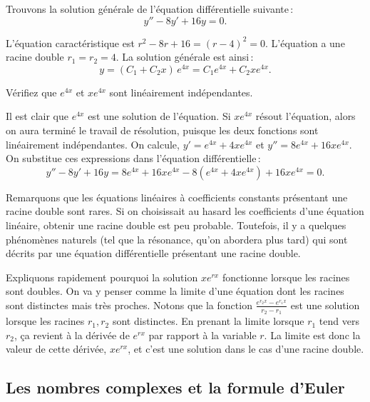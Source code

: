 \begin{example}
Trouvons la solution générale de l'équation différentielle suivante\,:
\begin{equation*}
y'' -8 y' + 16 y = 0 .
\end{equation*}

L'équation caractéristique est $r^2 - 8 r + 16 = {(r-4)}^2 = 0$.
L'équation a une racine double $r_1 = r_2 = 4$.  La solution générale est ainsi\,: 
\begin{equation*}
y = (C_1 + C_2 x)\, e^{4 x} = C_1 e^{4x} + C_2 x e^{4x} .
\end{equation*}

\begin{exercise}
Vérifiez que  $e^{4x}$ et $x e^{4x}$ sont linéairement indépendantes. 
\end{exercise}

Il est clair que $e^{4x}$ est une solution de l'équation. Si $x e^{4x}$ résout l'équation, alors on aura terminé le travail de résolution, puisque les deux fonctions sont linéairement indépendantes. On calcule,
$y' = e^{4x} + 4xe^{4x}$ et
$y'' = 8 e^{4x} + 16xe^{4x}$.  On substitue ces expressions dans l'équation différentielle\,: 
\begin{equation*}
y'' - 8 y' + 16 y = 
8 e^{4x} + 16xe^{4x} - 8(e^{4x} + 4xe^{4x}) + 16 xe^{4x} = 
0 .
\end{equation*}
\end{example}

Remarquons que les équations linéaires à coefficients constants présentant une racine double sont rares. Si on choisissait au hasard les coefficients d'une équation linéaire, obtenir une racine double est peu probable. Toutefois, il y a quelques phénomènes naturels (tel que la résonance, qu'on abordera plus tard) qui sont décrits par une équation différentielle présentant une racine double.

Expliquons rapidement pourquoi la solution  $x e^{r x}$ fonctionne lorsque les racines sont doubles. On va y penser comme la limite d'une équation dont les racines sont distinctes mais très proches.  Notons que la fonction  
$\frac{e^{r_2 x} - e^{r_1 x}}{r_2 - r_1}$ est une solution lorsque les racines $r_1,r_2$ sont distinctes. En prenant la limite lorsque  $r_1$ tend vers $r_2$, ça revient à la dérivée de $e^{rx}$ par rapport à la variable $r$.  La limite est donc la valeur de cette dérivée, 
$x e^{rx}$, et c'est une solution dans le cas d'une racine double.

\subsection{Les nombres complexes et la formule d'Euler}

